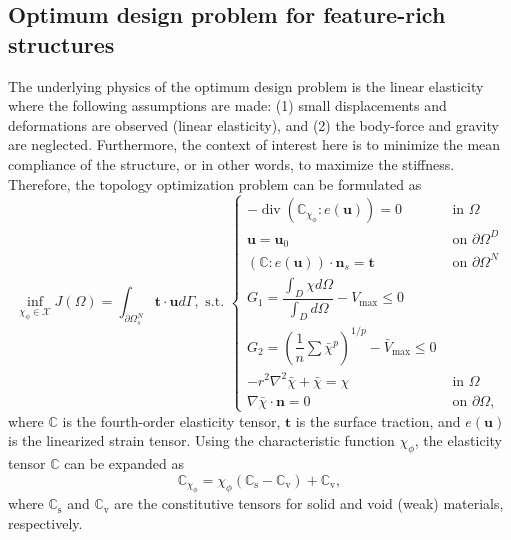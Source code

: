 \subsection{Optimum design problem for feature-rich structures}\label{Section: topology optimization problem}

The underlying physics of the optimum design problem is the linear elasticity where the following assumptions are made: (1) small displacements and deformations are observed (linear elasticity), and (2) the body-force and gravity are neglected. Furthermore, the context of interest here is to minimize the mean compliance of the structure, or in other words, to maximize the stiffness. Therefore, the topology optimization problem can be formulated as
\begin{subequations}
	\begin{equation}
		\inf _{\chi_{\phi} \in \mathcal{X}} J(\Omega)=\int_{\partial \Omega_{s}^{N}} \boldsymbol{t} \cdot \boldsymbol{u} d \Gamma,
		\label{eq: objective function}
	\end{equation}
	\begin{equation}
		\text { s.t. }\left\{\begin{array}{ll}
			-\operatorname{div}(\mathbb{C}_{\chi_{\phi}} : e(\boldsymbol{u}))=0 & \text { in } \Omega \\
			\boldsymbol{u}=\boldsymbol{u}_{0} & \text { on } \partial \Omega^{D} \\
			(\mathbb{C}: e(\boldsymbol{u})) \cdot \boldsymbol{n}_{s}=\mathbf{t} & \text { on } \partial \Omega^{N} \\
			G_{1}=\dfrac{\int_{D} \chi d \Omega}{\int_{D} d \Omega}-V_{\max } \leq 0 & \\
			G_2=\left(\dfrac{1}{n} \sum \bar{\chi}^{p}\right)^{1 / p}-\bar{V}_{\max } \leq 0 & \\
			-r^2 \nabla^2 \bar{\chi} +  \bar{\chi} =  \chi & \text{ in } \Omega \\
			\nabla \bar{\chi} \cdot \boldsymbol{n} = 0 & \text{ on } \partial \Omega,
		\end{array}\right.
		\label{eq: governing equation and constraints}
	\end{equation}
	\label{eq: topology optimization mathematical model}
\end{subequations}
where $\mathbb{C}$ is the fourth-order elasticity tensor, $\boldsymbol{t}$ is the surface traction, and $e\left(\boldsymbol{u}\right)$ is the linearized strain tensor. Using the characteristic function $\chi_{\phi}$, the elasticity tensor $\mathbb{C}$ can be expanded as
\begin{equation}
	\mathbb{C}_{\chi_{\phi}} = \chi_{\phi} \left(\mathbb{C}_{\text{s}} - \mathbb{C}_{\text{v}} \right) + \mathbb{C}_{\text{v}},
\end{equation}
where $\mathbb{C}_{\text{s}}$ and $\mathbb{C}_{\text{v}}$ are the constitutive tensors for solid and void (weak) materials, respectively. 

